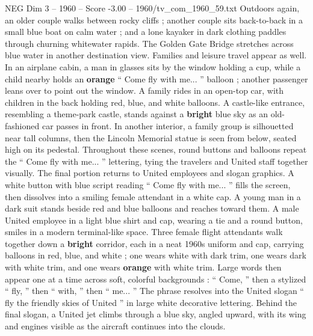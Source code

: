 \begin{textsample}{NEG Dim 3 – 1960 – Score -3.00 – 1960/tv\_com\_1960\_59.txt}
Outdoors again, an older couple walks between rocky cliffs ; another couple sits back-to-back in a small blue boat on calm water ; and a lone kayaker in dark clothing paddles through churning whitewater rapids.
The Golden Gate Bridge stretches across blue water in another destination view.
Families and leisure travel appear as well.
In an airplane cabin, a man in glasses sits by the window holding a cup, while a child nearby holds an \textbf{orange} “ Come fly with me... ” balloon ; another passenger leans over to point out the window.
A family rides in an open-top car, with children in the back holding red, blue, and white balloons.
A castle-like entrance, resembling a theme-park castle, stands against a \textbf{bright} blue sky as an old-fashioned car passes in front.
In another interior, a family group is silhouetted near tall columns, then the Lincoln Memorial statue is seen from below, seated high on its pedestal.
Throughout these scenes, round buttons and balloons repeat the “ Come fly with me... ” lettering, tying the travelers and United staff together visually.
The final portion returns to United employees and slogan graphics.
A white button with blue script reading “ Come fly with me... ” fills the screen, then dissolves into a smiling female attendant in a white cap.
A young man in a dark suit stands beside red and blue balloons and reaches toward them.
A male United employee in a light blue shirt and cap, wearing a tie and a round button, smiles in a modern terminal-like space.
Three female flight attendants walk together down a \textbf{bright} corridor, each in a neat 1960s uniform and cap, carrying balloons in red, blue, and white ; one wears white with dark trim, one wears dark with white trim, and one wears \textbf{orange} with white trim.
Large words then appear one at a time across soft, colorful backgrounds : “ Come, ” then a stylized “ fly, ” then “ with, ” then “ me... ” The phrase resolves into the United slogan “ fly the friendly skies of United ” in large white decorative lettering.
Behind the final slogan, a United jet climbs through a blue sky, angled upward, with its wing and engines visible as the aircraft continues into the clouds.

\end{textsample}
